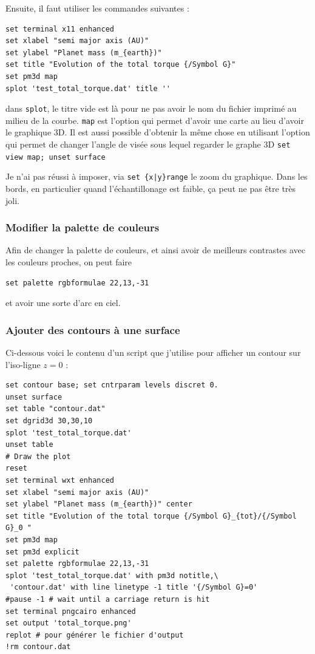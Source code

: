 \documentclass[a4paper,twoside]{article}
\begin{document}
Ensuite, il faut utiliser les commandes suivantes :
\begin{verbatim}
set terminal x11 enhanced
set xlabel "semi major axis (AU)"
set ylabel "Planet mass (m_{earth})"
set title "Evolution of the total torque {/Symbol G}"
set pm3d map
splot 'test_total_torque.dat' title ''
\end{verbatim}
dans \texttt{splot}, le titre vide est là pour ne pas avoir le nom du fichier imprimé au milieu de la courbe. \texttt{map} est l'option qui permet d'avoir une carte au lieu d'avoir le graphique 3D. Il est aussi possible d'obtenir la même chose en utilisant l'option qui permet de changer l'angle de visée sous lequel regarder le graphe 3D \texttt{set view map; unset surface}

\begin{remarque}
Je n'ai pas réussi à imposer, via \verb#set {x|y}range# le zoom du graphique. Dans les bords, en particulier quand l'échantillonage est faible, ça peut ne pas être très joli. 
\end{remarque}

\subsubsection{Modifier la palette de couleurs}
Afin de changer la palette de couleurs, et ainsi avoir de meilleurs contrastes avec les couleurs proches, on peut faire 
\begin{verbatim}
set palette rgbformulae 22,13,-31
\end{verbatim}
et avoir une sorte d'arc en ciel.

\subsubsection{Ajouter des contours à une surface}
Ci-dessous voici le contenu d'un script que j'utilise pour afficher un contour sur l'iso-ligne $z=0$ : 
\begin{verbatim}
set contour base; set cntrparam levels discret 0.
unset surface
set table "contour.dat"
set dgrid3d 30,30,10
splot 'test_total_torque.dat'
unset table
# Draw the plot
reset
set terminal wxt enhanced
set xlabel "semi major axis (AU)"
set ylabel "Planet mass (m_{earth})" center
set title "Evolution of the total torque {/Symbol G}_{tot}/{/Symbol G}_0 "
set pm3d map
set pm3d explicit
set palette rgbformulae 22,13,-31
splot 'test_total_torque.dat' with pm3d notitle,\
 'contour.dat' with line linetype -1 title '{/Symbol G}=0'
#pause -1 # wait until a carriage return is hit
set terminal pngcairo enhanced
set output 'total_torque.png'
replot # pour générer le fichier d'output
!rm contour.dat
\end{verbatim}
\end{document}
